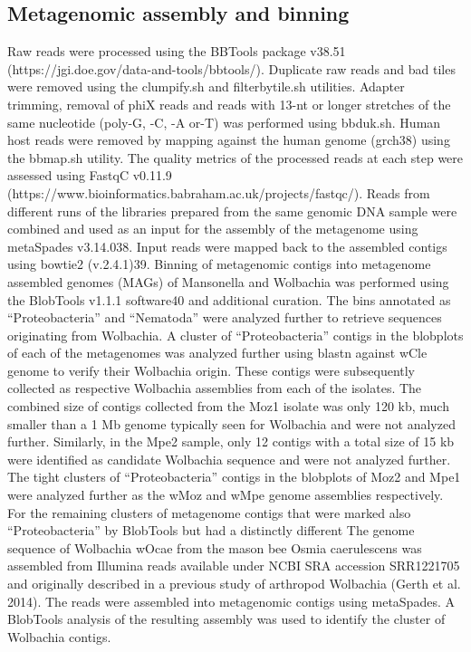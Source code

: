 \documentclass[10pt, a4paper, twocolumn]{article} %
\begin{document}
\subsection{Metagenomic assembly and binning}
Raw reads were processed using the BBTools package v38.51 (https://jgi.doe.gov/data-and-tools/bbtools/). Duplicate raw reads and bad tiles were removed using the clumpify.sh and filterbytile.sh utilities. Adapter trimming, removal of phiX reads and reads with 13-nt or longer stretches of the same nucleotide (poly-G, -C, -A or-T) was performed using bbduk.sh. Human host reads were removed by mapping against the human genome (grch38) using the bbmap.sh utility. The quality metrics of the processed reads at each step were assessed using FastqC v0.11.9 (https://www.bioinformatics.babraham.ac.uk/projects/fastqc/).
Reads from different runs of the libraries prepared from the same genomic DNA sample were combined and used as an input for the assembly of the metagenome using metaSpades v3.14.038. Input reads were mapped back to the assembled contigs using bowtie2 (v.2.4.1)39. Binning of metagenomic contigs into metagenome assembled genomes (MAGs) of Mansonella and Wolbachia was performed using the BlobTools v1.1.1 software40 and additional curation. The bins annotated as “Proteobacteria” and “Nematoda” were analyzed further to retrieve sequences originating from Wolbachia. A cluster of “Proteobacteria” contigs in the blobplots of each of the metagenomes was analyzed further using blastn against wCle genome to verify their Wolbachia origin. These contigs were subsequently collected as respective Wolbachia assemblies from each of the isolates. The combined size of contigs collected from the Moz1 isolate was only 120 kb, much smaller than a 1 Mb genome typically seen for Wolbachia and were not analyzed further. Similarly, in the Mpe2 sample, only 12 contigs with a total size of 15 kb were identified as candidate Wolbachia sequence and were not analyzed further. The tight clusters of “Proteobacteria” contigs in the blobplots of Moz2 and Mpe1 were analyzed further as the wMoz and wMpe genome assemblies respectively. For the remaining clusters of metagenome contigs that were marked also “Proteobacteria” by BlobTools but had a distinctly different %
The genome sequence of Wolbachia wOcae from the mason bee Osmia caerulescens was assembled from Illumina reads available under NCBI SRA accession SRR1221705 and originally described in a previous study of arthropod Wolbachia (Gerth et al. 2014). The reads were assembled into metagenomic contigs using metaSpades. A BlobTools analysis of the resulting assembly was used to identify the cluster of Wolbachia contigs. 
\end{document}
